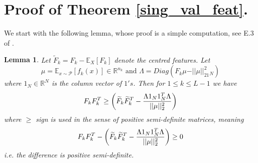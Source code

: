 \documentclass{article}
\theoremstyle{plain}
\newtheorem{lemma}[Theorem]{Lemma}
\theoremstyle{definition}
\theoremstyle{remark}
\newcommand\R{\mathbb{R}}
\begin{document}
\section{Proof of Theorem \ref{sing_val_feat}.}\label{sec_proof_sing_val_feat}

We start with the following lemma, whose proof is a simple computation, see
E.3 of \cite{nguyen2021tight}.


\begin{lemma}\label{centfeat_est}
Let $\widetilde{F}_k = F_k - \mathbb{E}_{X}[F_k]$ denote the centred features. 
Let
\begin{equation*}
    \mu = 
\mathbb{E}_{x \sim \mathcal{P}}[f_k(x)] \in \R^{n_k} \text{ and }
\Lambda = Diag(F_k\mu - \vert\vert \mu\vert\vert^2_21_N)
\end{equation*}
where 
$1_N \in \R^N$ is the column vector of $1's$. Then for $1 \leq k \leq L-1$ we have
\begin{equation*}
F_kF_k^T \geq \bigg{(}
\widetilde{F}_k\widetilde{F}_k^T - 
\frac{\Lambda 1_N1_N^T\Lambda}{\vert\vert\mu\vert\vert^2_2}
\bigg{)}
\end{equation*}
where $\geq$ sign is used in the sense of positive semi-definite matrices, meaning
\begin{equation*}
	F_kF_k^T - 
	\bigg{(}
\widetilde{F}_k\widetilde{F}_k^T - 
\frac{\Lambda 1_N1_N^T\Lambda}{\vert\vert\mu\vert\vert^2_2}
\bigg{)} \geq 0
\end{equation*}
i.e. the difference is positive semi-definite.
\end{lemma}
\end{document}
